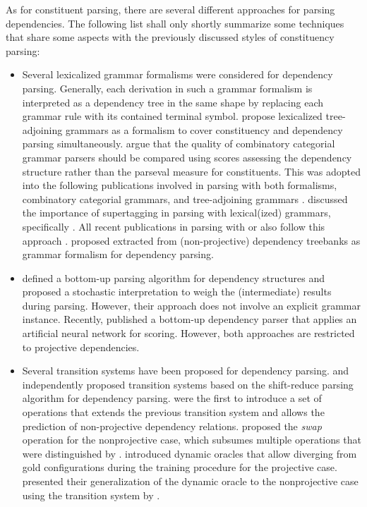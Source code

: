 \documentclass[../document.tex]{subfiles}
\begin{document}
    As for constituent parsing, there are several different approaches for parsing dependencies.
    The following list shall only shortly summarize some techniques that share some aspects with the previously discussed styles of constituency parsing:
    \begin{itemize}
        \item Several lexicalized grammar formalisms were considered for dependency parsing. Generally, each derivation in such a grammar formalism is interpreted as a dependency tree in the same shape by replacing each grammar rule with its contained terminal symbol. \citet{chiang2000statistical} propose lexicalized tree-adjoining grammars as a formalism to cover constituency and dependency parsing simultaneously. \citet{hockenmaier2002generative} argue that the quality of combinatory categorial grammar parsers should be compared using scores assessing the dependency structure rather than the parseval measure for constituents. This was adopted into the following publications involved in parsing with both formalisms, combinatory categorial grammars, and tree-adjoining grammars \citep{Kas17,Bla18}. \citet{Clark04} discussed the importance of supertagging in parsing with lexical(ized) grammars, specifically . All recent publications in parsing with  or  also follow this approach \citep{Kas17,LewisSteedman14}.
         proposed  extracted from (non-projective) dependency treebanks as grammar formalism for dependency parsing.
        \item \citet{eisner-1996-three} defined a bottom-up parsing algorithm for dependency structures and proposed a stochastic interpretation to weigh the (intermediate) results during parsing. However, their approach does not involve an explicit grammar instance. Recently, \citet{yang-tu-2022-headed} published a bottom-up dependency parser that applies an artificial neural network for scoring. However, both approaches are restricted to projective dependencies.
        \item Several transition systems have been proposed for dependency parsing. \citet{nivre-2003-efficient} and \citet{yamada-matsumoto-2003-statistical} independently proposed transition systems based on the shift-reduce parsing algorithm for dependency parsing. \citet{attardi-2006-experiments} were the first to introduce a set of operations that extends the previous transition system and allows the prediction of non-projective dependency relations. \citet{Nivre09} proposed the \emph{swap} operation for the nonprojective case, which subsumes multiple operations that were distinguished by \citet{attardi-2006-experiments}. \citet{Goldberg12} introduced dynamic oracles that allow diverging from gold configurations during the training procedure for the projective case. \citet{gomez2014polynomial} presented their generalization of the dynamic oracle to the nonprojective case using the transition system by \citet{attardi-2006-experiments}.
    \end{itemize}
\end{document}
